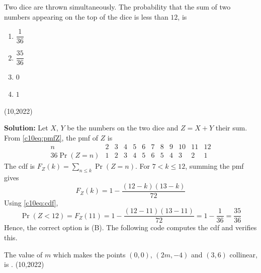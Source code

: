 \nopagebreak[4]
\begin{center}
\end{center}

\clearpage
\item Two dice are thrown simultaneously. The probability that the sum of two numbers appearing on the top of the dice is less than $12$, is
\begin{enumerate}[label=(\Alph*), itemsep=3pt]
\item $\dfrac{1}{36}$
\item $\dfrac{35}{36}$
\item $0$
\item $1$
\end{enumerate}
\hfill (10,2022)

\textbf{Solution:} Let $X$, $Y$ be the numbers on the two dice and $Z = X + Y$ their sum. From \eqref{c10eq:pmfZ}, the pmf of $Z$ is
\begin{equation}
\begin{array}{c|ccccccccccc}
n & 2 & 3 & 4 & 5 & 6 & 7 & 8 & 9 & 10 & 11 & 12 \\ \hline
36\Pr(Z = n) & 1 & 2 & 3 & 4 & 5 & 6 & 5 & 4 & 3 & 2 & 1
\end{array}
\end{equation}
The cdf is $F_Z(k) = \sum_{n \le k}\Pr(Z = n)$. For $7 < k \le 12$, summing the pmf gives
\begin{equation}
F_Z(k) = 1 - \frac{(12-k)(13-k)}{72}
\end{equation}
Using \eqref{c10eq:cdf},
\begin{equation}
\Pr(Z < 12) = F_Z(11) = 1 - \frac{(12-11)(13-11)}{72} = 1 - \frac{1}{36} = \frac{35}{36}
\end{equation}
Hence, the correct option is (B). The following code computes the cdf and verifies this.

\nopagebreak[4]
\begin{center}
\end{center}


\clearpage
\item The value of $m$ which makes the points $(0, 0)$, $(2m, -4)$ and $(3, 6)$ collinear, is \underline{\hspace{1.5cm}}. \hfill (10,2022)

